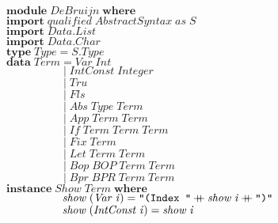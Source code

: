 \documentclass[10pt]{article}
\newcommand{\Conid}[1]{\mathit{#1}}
\newcommand{\Varid}[1]{\mathit{#1}}
\newcommand{\plus}{\mathbin{+\!\!\!+}}
\begin{document}
\begin{hscode}\SaveRestoreHook
${\mathbf{module}\;\Conid{DeBruijn}\;\mathbf{where}}$\\
${}$\\
${\mathbf{import}\;\Varid{qualified}\;\Conid{AbstractSyntax}\;\Varid{as}\;\Conid{S}}$\\
${\mathbf{import}\;\Conid{\Conid{Data}.List}}$\\
${\mathbf{import}\;\Conid{\Conid{Data}.Char}}$\\
${}$\\
${\mathbf{type}\;\Conid{Type}\mathrel{=}\Conid{\Conid{S}.Type}}$\\
${\mathbf{data}\;\Conid{Term}\mathrel{=}\Conid{Var}\;\Conid{Int}}$\\
${\phantom{\mathbf{data}\;\Conid{Term}\mbox{}}\mid \Conid{IntConst}\;\Conid{Integer}}$\\
${\phantom{\mathbf{data}\;\Conid{Term}\mbox{}}\mid \Conid{Tru}}$\\
${\phantom{\mathbf{data}\;\Conid{Term}\mbox{}}\mid \Conid{Fls}}$\\
${\phantom{\mathbf{data}\;\Conid{Term}\mbox{}}\mid \Conid{Abs}\;\Conid{Type}\;\Conid{Term}}$\\
${\phantom{\mathbf{data}\;\Conid{Term}\mbox{}}\mid \Conid{App}\;\Conid{Term}\;\Conid{Term}}$\\
${\phantom{\mathbf{data}\;\Conid{Term}\mbox{}}\mid \Conid{If}\;\Conid{Term}\;\Conid{Term}\;\Conid{Term}}$\\
${\phantom{\mathbf{data}\;\Conid{Term}\mbox{}}\mid \Conid{Fix}\;\Conid{Term}}$\\
${\phantom{\mathbf{data}\;\Conid{Term}\mbox{}}\mid \Conid{Let}\;\Conid{Term}\;\Conid{Term}}$\\
${\phantom{\mathbf{data}\;\Conid{Term}\mbox{}}\mid \Conid{Bop}\;\Conid{BOP}\;\Conid{Term}\;\Conid{Term}}$\\
${\phantom{\mathbf{data}\;\Conid{Term}\mbox{}}\mid \Conid{Bpr}\;\Conid{BPR}\;\Conid{Term}\;\Conid{Term}}$\\
${}$\\
${\mathbf{instance}\;\Conid{Show}\;\Conid{Term}\;\mathbf{where}}$\\
${\hskip5.00em\relax\Varid{show}\;(\Conid{Var}\;\Varid{i})\mathrel{=}\text{\tt \char34 (Index~\char34}\plus \Varid{show}\;\Varid{i}\plus \text{\tt \char34 )\char34}}$\\
${\hskip5.00em\relax\Varid{show}\;(\Conid{IntConst}\;\Varid{i})\mathrel{=}\Varid{show}\;\Varid{i}}$\\

\end{hscode}
\end{document}
